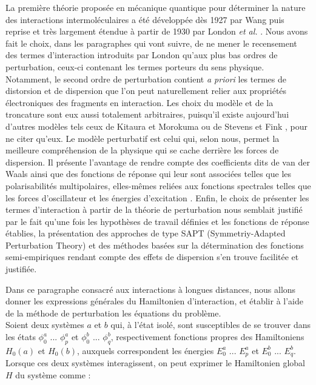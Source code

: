 	
	La première théorie proposée en mécanique quantique pour déterminer la nature des interactions intermoléculaires a été développée dès 1927 par Wang \cite{wang1927mutual} puis reprise et très largement étendue à partir de 1930 par London \textit{et al.} \cite{london1930z}. Nous avons fait le choix, dans les paragraphes qui vont suivre, de ne mener le recensement des termes d’interaction introduits par London qu'aux plus bas ordres de perturbation, ceux-ci contenant les termes porteurs du sens physique. Notamment, le second ordre de perturbation contient \textit{a priori} les termes de distorsion et de dispersion que l’on peut naturellement relier aux propriétés électroniques des fragments en interaction. Les choix du modèle et de la troncature sont eux aussi totalement arbitraires, puisqu’il existe aujourd’hui d’autres modèles tels ceux de Kitaura et Morokuma \cite{morokuma1977molecules} ou de Stevens et Fink \cite{stevens1987frozen}, pour ne citer qu’eux. Le modèle perturbatif est celui qui, selon nous, permet la meilleure compréhension de la physique qui se cache derrière les forces de dispersion. Il présente l'avantage de rendre compte des coefficients dits de van der Waals ainsi que des fonctions de réponse qui leur sont associées telles que les polarisabilités multipolaires, elles-mêmes reliées aux fonctions spectrales telles que les forces d’oscillateur et les énergies d’excitation \cite{begue1999dynamic}. Enfin, le choix de présenter les termes d’interaction à partir de la théorie de perturbation nous semblait justifié par le fait qu’une fois les hypothèses de travail définies et les fonctions de réponse établies, la présentation des approches de type SAPT (Symmetriy-Adapted Perturbation Theory) et des méthodes basées sur la détermination des fonctions semi-empiriques rendant compte des effets de dispersion s’en trouve facilitée et justifiée.
	
	
	Dans ce paragraphe consacré aux interactions à longues distances, nous allons donner les expressions générales du Hamiltonien d'interaction, et établir à l'aide de la méthode de perturbation les équations du problème.\\ 
	
	Soient deux systèmes $a$ et $b$ qui, à l'état isolé, sont susceptibles de se trouver dans les états $\phi_{0}^{a}$ ... $\phi_{p}^{a}$ et $\phi_{0}^{b}$ ... $\phi_{q}^{b}$, respectivement fonctions propres des Hamiltoniens $H_{0}(a)$ et $H_{0}(b)$, auxquels correspondent les énergies $E_{0}^{a}$ ... $E_{p}^{a}$ et $E_{0}^{b}$ ... $E_{q}^{b}$. Lorsque ces deux systèmes interagissent, on peut exprimer le Hamiltonien global $H$ du système comme : 
	
